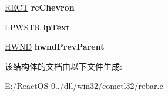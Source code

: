 \begin{DoxyCompactItemize}
\item 
\mbox{\label{struct_r_e_b_a_r___b_a_n_d_a91088f68a8d5c955eef9ffb8907e64e7}} 
\hyperlink{structtag_r_e_c_t}{R\+E\+CT} {\bfseries rc\+Chevron}
\item 
\mbox{\label{struct_r_e_b_a_r___b_a_n_d_a5a07bee6b90a2bcf64042474d39b03c3}} 
L\+P\+W\+S\+TR {\bfseries lp\+Text}
\item 
\mbox{\label{struct_r_e_b_a_r___b_a_n_d_a7e10c4fa9272b443d1a6224380bca107}} 
\hyperlink{interfacevoid}{H\+W\+ND} {\bfseries hwnd\+Prev\+Parent}
\end{DoxyCompactItemize}


该结构体的文档由以下文件生成\+:\begin{DoxyCompactItemize}
\item 
E\+:/\+React\+O\+S-\/0../dll/win32/comctl32/rebar.\+c\end{DoxyCompactItemize}
